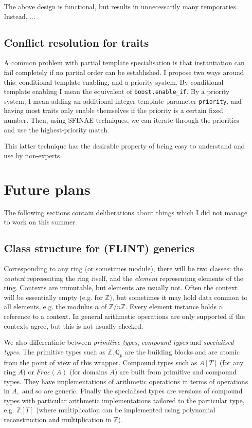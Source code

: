\documentclass{scrartcl}
\begin{document}
The above design is functional, but results in unnecessarily many
temporaries. Instead, ...

\subsection*{Conflict resolution for traits}

A common problem with partial template specialisation is that instantiation
can fail completely if no partial order can be established. I propose two
ways around this: conditional template enabling, and a priority system. By
conditional template enabling I mean the equivalent of
\texttt{boost.enable\_if}. By a priority system, I mean adding an
additional integer template parameter \texttt{priority}, and having most
traits only enable themselves if the priority is a certain fixed number.
Then, using SFINAE techniques, we can iterate through the priorities and
use the highest-priority match.

This latter technique has the desirable property of being easy to
understand and use by non-experts.

\section*{Future plans}

The following sections contain deliberations about things which I did not
manage to work on this summer.

\subsection*{Class structure for (FLINT) generics}

Corresponding to any ring (or sometimes module),
there will be two classes: the \emph{context}
representing the ring itself, and the \emph{element} representing elements
of the ring. Contexts are immutable, but elements are usually not. Often
the context will be essentially empty (e.g. for $\mathbb{Z}$), but
sometimes it may hold data common to all elements, e.g. the modulus $n$ of
$\mathbb{Z}/n\mathbb{Z}.$ Every element instance holds a reference to a
context. In general arithmetic operations are only supported if the
contexts agree, but this is not usually checked.

We also differentiate between \emph{primitive
types}, \emph{compound types} and \emph{specialised types}. The primitive
types such as $\mathbb{Z}, \mathbb{Q}_p$
are the building blocks and are atomic from the point of view of this
wrapper. Compound types such as $A[T]$ (for any ring $A$) or $Frac(A)$ (for
domains $A$) are built from primitive and compound types. They have
implementations of arithmetic operations in terms of operations in $A,$ and
so are generic. Finally the specialised types are versions of compound
types with particular arithmetic implementations tailored to the particular
type, e.g. $\mathbb{Z}[T]$ (where multiplication can be implemented using
polynomial reconstruction and multiplication in $\mathbb{Z}$).
\end{document}
